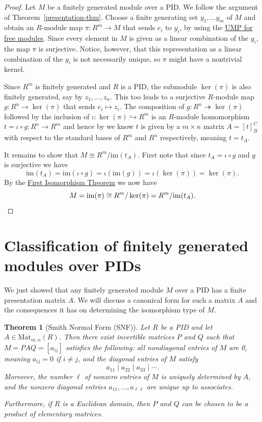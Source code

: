 \documentclass[12pt]{report}
\newtheorem{theorem}{Theorem}[chapter]
\numberwithin{equation}{section}
\numberwithin{theorem}{chapter}
\theoremstyle{definition}
\newtheorem*{basic properties}{Basic Properties}
\newtheorem*{Important Remark}{Important Remark}
\renewcommand{\ker}{\operatorname{ker}}
\begin{document}
\begin{proof} 
Let $M$ be a finitely generated module over a PID. We follow the argument of Theorem~\ref{presentation-thm}. Choose a finite generating set $y_1, \dots y_m$ of $M$ and obtain an $R$-module map
$\pi\!: R^m \to M$
that sends $e_i$ to $y_i$, by using the \hyperref[UMPfreemod]{UMP for free modules}. Since every element in $M$ is given as a linear combination of the $y_i$, the map $\pi$ is surjective. Notice, however, that this representation as a linear combination of the $y_i$ is not necessarily unique, so $\pi$ might have a nontrivial kernel. 

Since $R^m$ is finitely generated and $R$ is a PID, the submodule $\ker(\pi)$ is also finitely generated, say by $z_1, \dots, z_n$. This too leads to a
surjective $R$-module map $g\!: R^n \to \ker(\pi)$ that sends $e_i \mapsto z_i$. 
The composition of $g\!: R^n \twoheadrightarrow \ker(\pi)$ followed by the inclusion of $\iota\!: \ker(\pi) \hookrightarrow R^m$ is an $R$-module homomorphism $t=\iota \circ g:R^n \to R^m$ and hence by  we know $t$ is given by a $m \times n$ matrix $A=[t]_B^C$ with respect to the standard bases of $R^m$ and $R^n$ respectively, meaning $t=t_A$. 

It remains to show that $M\cong R^m/\mathrm{im}(t_A)$. First note that since $t_A=\iota \circ g$ and $g$ is surjective we have 
$$\mathrm{im}(t_A)=\mathrm{im}(\iota \circ g)=\iota(\mathrm{im}(g))=\iota(\ker(\pi))=\ker(\pi).$$ 
By the \hyperref[first iso thm]{First Isomorphism Theorem} we now have 
$$M = \mathrm{im}(\pi)\cong R^m/\ker(\pi)= R^m/\mathrm{im}(t_A).\qedhere$$
\end{proof}





\section{Classification of finitely generated modules over PIDs}

We just showed that any finitely generated module $M$ over a PID has a finite presentation matrix $A$. We will discuss a canonical form for such a matrix $A$ and the consequences it has on determining the isomorphism type of $M$.

 
\begin{theorem}[Smith Normal Form (SNF)]\label{Smith Normal Form}
 Let $R$ be a PID and let $A \in \mathrm{Mat}_{m,n}(R)$. Then there exist invertible matrices $P$ and $Q$ such that $M = PAQ = [a_{ij}]$ satisfies the following: all nondiagonal entries of $M$ are 0, meaning $a_{ij} = 0$ if $i \neq j$, and the diagonal entries of $M$ satisfy 
$$a_{11} \mid a_{22} \mid a_{33} \mid \cdots.$$
Moreover, the number $\ell$ of nonzero entries of $M$ is uniquely determined by $A$, and the nonzero diagonal entries $a_{11},\ldots, a_{\ell \ell}$ are unique up to associates.

Furthermore, if $R$ is a Euclidean domain, then $P$ and $Q$ can be chosen to be a product of elementary matrices.
\end{theorem}
 
\end{document}
